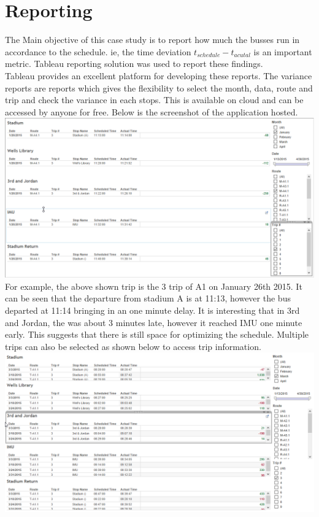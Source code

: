 \documentclass[12pt]{article}
\begin{document}
\section{Reporting}
The Main objective of this case study is to report how much the busses run in accordance to the schedule. ie, the time deviation $t_{schedule}-t_{acutal}$ is an important metric. Tableau reporting solution was used to report these findings. \\
Tableau provides an excellent platform for developing these reports. The variance reports are reports which gives the flexibility to select the month, data, route and trip and check the variance in each stops. This is available on cloud and can be accessed by anyone for free. Below is the screenshot of the application hosted.\\
\includegraphics[scale=0.55]{resources/tableau4}\\[1cm] 
For example, the above shown trip is the 3 trip of A1 on January 26th 2015. It can be seen that the departure from stadium A is at 11:13, however the bus departed at 11:14 bringing in an one minute delay. It is interesting that in 3rd and Jordan, the was about 3 minutes late, however it reached IMU one minute early. This suggests that there is still space for optimizing the schedule. Multiple trips can also be selected as shown below to access trip information.
\includegraphics[scale=0.55]{resources/tableau5}\\[1cm] 
\end{document}
